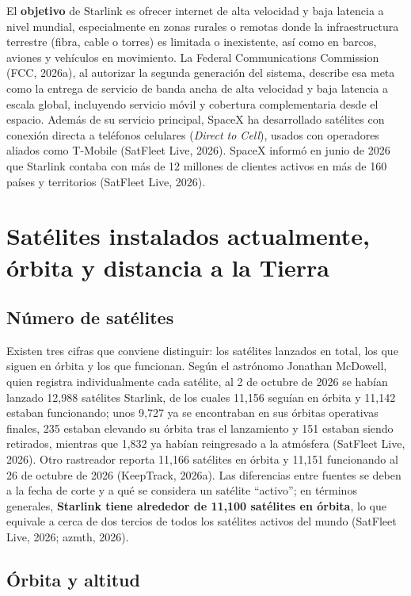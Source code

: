 \documentclass[12pt,letterpaper]{article}
\begin{document}
El \textbf{objetivo} de Starlink es ofrecer internet de alta velocidad y baja latencia a nivel mundial, especialmente en zonas rurales o remotas donde la infraestructura terrestre (fibra, cable o torres) es limitada o inexistente, así como en barcos, aviones y vehículos en movimiento. La Federal Communications Commission (FCC, 2026a), al autorizar la segunda generación del sistema, describe esa meta como la entrega de servicio de banda ancha de alta velocidad y baja latencia a escala global, incluyendo servicio móvil y cobertura complementaria desde el espacio. Además de su servicio principal, SpaceX ha desarrollado satélites con conexión directa a teléfonos celulares (\textit{Direct to Cell}), usados con operadores aliados como T-Mobile (SatFleet Live, 2026). SpaceX informó en junio de 2026 que Starlink contaba con más de 12 millones de clientes activos en más de 160 países y territorios (SatFleet Live, 2026).

\section{Satélites instalados actualmente, órbita y distancia a la Tierra}

\subsection{Número de satélites}

Existen tres cifras que conviene distinguir: los satélites lanzados en total, los que siguen en órbita y los que funcionan. Según el astrónomo Jonathan McDowell, quien registra individualmente cada satélite, al 2 de octubre de 2026 se habían lanzado 12,988 satélites Starlink, de los cuales 11,156 seguían en órbita y 11,142 estaban funcionando; unos 9,727 ya se encontraban en sus órbitas operativas finales, 235 estaban elevando su órbita tras el lanzamiento y 151 estaban siendo retirados, mientras que 1,832 ya habían reingresado a la atmósfera (SatFleet Live, 2026). Otro rastreador reporta 11,166 satélites en órbita y 11,151 funcionando al 26 de octubre de 2026 (KeepTrack, 2026a). Las diferencias entre fuentes se deben a la fecha de corte y a qué se considera un satélite ``activo''; en términos generales, \textbf{Starlink tiene alrededor de 11,100 satélites en órbita}, lo que equivale a cerca de dos tercios de todos los satélites activos del mundo (SatFleet Live, 2026; azmth, 2026).

\subsection{Órbita y altitud}
\end{document}
